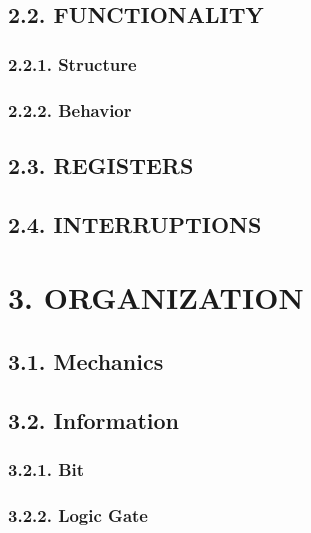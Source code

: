 \documentclass[
]{article}
\begin{document}
\hypertarget{functionality}{%
\subsection{2.2. FUNCTIONALITY}\label{functionality}}

\hypertarget{structure}{%
\subsubsection{2.2.1. Structure}\label{structure}}

\hypertarget{behavior}{%
\subsubsection{2.2.2. Behavior}\label{behavior}}

\hypertarget{registers}{%
\subsection{2.3. REGISTERS}\label{registers}}

\hypertarget{interruptions}{%
\subsection{2.4. INTERRUPTIONS}\label{interruptions}}

\hypertarget{organization}{%
\section{3. ORGANIZATION}\label{organization}}

\hypertarget{mechanics}{%
\subsection{3.1. Mechanics}\label{mechanics}}

\hypertarget{information}{%
\subsection{3.2. Information}\label{information}}

\hypertarget{bit}{%
\subsubsection{3.2.1. Bit}\label{bit}}

\hypertarget{logic-gate}{%
\subsubsection{3.2.2. Logic Gate}\label{logic-gate}}
\end{document}
